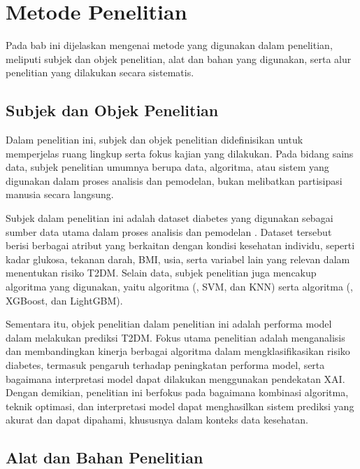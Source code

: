 \chapter{Metode Penelitian}

Pada bab ini dijelaskan mengenai metode yang digunakan dalam penelitian, meliputi subjek dan objek penelitian, alat dan bahan yang digunakan, serta alur penelitian yang dilakukan secara sistematis.

\section{Subjek dan Objek Penelitian}
Dalam penelitian ini, subjek dan objek penelitian didefinisikan untuk memperjelas ruang lingkup serta fokus kajian yang dilakukan. Pada bidang sains data, subjek penelitian umumnya berupa data, algoritma, atau sistem yang digunakan dalam proses analisis dan pemodelan, bukan melibatkan partisipasi manusia secara langsung.

Subjek dalam penelitian ini adalah dataset diabetes yang digunakan sebagai sumber data utama dalam proses analisis dan pemodelan . Dataset tersebut berisi berbagai atribut yang berkaitan dengan kondisi kesehatan individu, seperti kadar glukosa, tekanan darah, BMI, usia, serta variabel lain yang relevan dalam menentukan risiko T2DM. Selain data, subjek penelitian juga mencakup algoritma  yang digunakan, yaitu algoritma  (, SVM, dan KNN) serta algoritma  (, XGBoost, dan LightGBM).

Sementara itu, objek penelitian dalam penelitian ini adalah performa model  dalam melakukan prediksi T2DM. Fokus utama penelitian adalah menganalisis dan membandingkan kinerja berbagai algoritma dalam mengklasifikasikan risiko diabetes, termasuk pengaruh  terhadap peningkatan performa model, serta bagaimana interpretasi model dapat dilakukan menggunakan pendekatan XAI. Dengan demikian, penelitian ini berfokus pada bagaimana kombinasi algoritma, teknik optimasi, dan interpretasi model dapat menghasilkan sistem prediksi yang akurat dan dapat dipahami, khususnya dalam konteks data kesehatan.

\section{Alat dan Bahan Penelitian}

